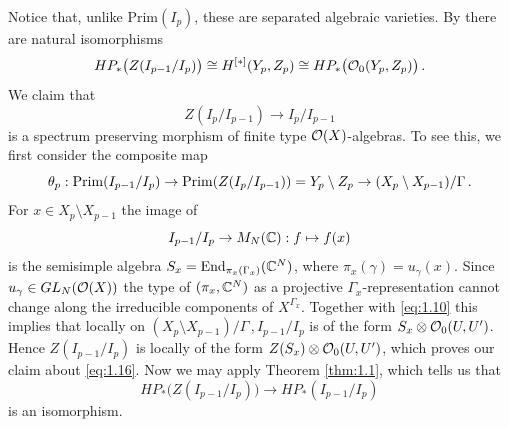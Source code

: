 Notice that, unlike Prim$ (I_p )$, these are separated algebraic varieties. 
By \cite[Theorem 9]{KNS} there are natural isomorphisms 
\begin{equation}
HP_* \big( Z (I_{p-1}/I_p )\big) \cong H^{[*]} (Y_p ,Z_p ) \cong
HP_* \big( \mathcal O_0 (Y_p ,Z_p ) \big) \,.
\end{equation}
We claim that 
\begin{equation}\label{eq:1.16}
Z (I_p / I_{p-1} ) \to I_p / I_{p-1} 
\end{equation}
is a spectrum preserving morphism of finite type $\mathcal O (X)$-algebras.
To see this, we first consider the composite map
\begin{equation}\label{eq:1.17} 
\theta_p : \mathrm{Prim}(I_{p-1} / I_p ) \to \mathrm{Prim}(Z (I_p / I_{p-1} )) = 
Y_p \setminus Z_p \to (X_p \setminus X_{p-1} ) / \Gamma \,.
\end{equation}
For $x \in X_p \setminus X_{p-1}$ the image of 
\[
I_{p-1} / I_p \to  M_N (\mathbb C ) : f \mapsto f(x)
\]
is the semisimple algebra $S_x = \mathrm{End}_{\pi_x (\Gamma_x )} ( \mathbb C^N )$, where 
$\pi_x (\gamma ) = u_\gamma (x)$. Since $u_\gamma \in GL_N (\mathcal O (X))$ the type of 
$(\pi_x ,\mathbb C^N )$ as a projective $\Gamma_x$-representation cannot change along the 
irreducible components of $X^{\Gamma_x}$. Together with \eqref{eq:1.10} this implies 
that locally on $(X_p \setminus X_{p-1} ) / \Gamma \,, I_{p-1} / I_p$ is of the form 
$S_x \otimes \mathcal O_0 (U,U')$. Hence $Z(I_{p-1} / I_p )$ is locally of the form 
$Z (S_x) \otimes \mathcal O_0 (U,U')$, which proves our claim about \eqref{eq:1.16}. 
Now we may apply Theorem \ref{thm:1.1}, which tells us that
\begin{equation}
HP_* \big( Z (I_{p-1}/I_p )\big) \to HP_* (I_{p-1}/I_p )
\end{equation}
is an isomorphism.


